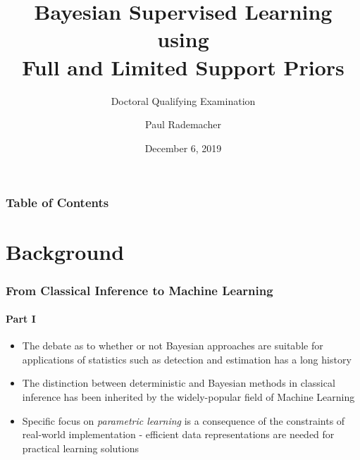 \documentclass[aspectratio=169,usenames,dvipsnames]{beamer}
\title[Bayesian Supervised Learning]{Bayesian Supervised Learning using \\Full and Limited Support Priors}
\subtitle{Doctoral Qualifying Examination}
\author[Rademacher]{Paul Rademacher}
\institute[GWU] 
{
  The George Washington University\\Department of Electrical and Computer Engineering
}
\date{December 6, 2019}
\begin{document}


\begin{frame}
\titlepage
\end{frame}


\begin{frame}
    \frametitle{Table of Contents}
    \tableofcontents
\end{frame}




\section{Background}


\begin{frame}
\frametitle{From Classical Inference to Machine Learning}
\framesubtitle{Part I}

\begin{itemize}
\item The debate as to whether or not Bayesian approaches are suitable for applications of statistics such as detection and estimation has a long history 
\vspace{0.5em}
\item The distinction between deterministic and Bayesian methods in classical inference has been inherited by the widely-popular field of \alert{Machine Learning}
\vspace{0.5em}
\item Specific focus on \emph{parametric learning} is a consequence of the constraints of real-world implementation - efficient data representations are needed for practical learning solutions


\end{itemize}

\end{frame}
\end{document}

